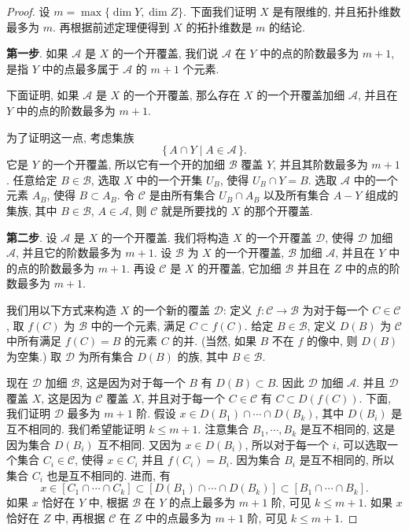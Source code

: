\begin{proof}
设 $m=\max\{\dim Y,\dim Z\}$. 下面我们证明 $X$ 是有限维的, 并且拓扑维数最多为 $m$. 再根据前述定理便得到 $X$ 的拓扑维数是 $m$ 的结论.

\textbf{第一步}. 如果 $\mathcal{A}$ 是 $X$ 的一个开覆盖, 我们说 $\mathcal{A}$ 在 $Y$ 中的点的阶数最多为 $m+1$, 是指 $Y$ 中的点最多属于 $\mathcal{A}$ 的 $m+1$ 个元素.

下面证明, 如果 $\mathcal{A}$ 是 $X$ 的一个开覆盖, 那么存在 $X$ 的一个开覆盖加细 $\mathcal{A}$, 并且在 $Y$ 中的点的阶数最多为 $m+1$.

为了证明这一点, 考虑集族
\[
\{\,A\cap Y\mid A\in\mathcal{A}\,\}.
\]
它是 $Y$ 的一个开覆盖, 所以它有一个开的加细 $\mathcal{B}$ 覆盖 $Y$, 并且其阶数最多为 $m+1$. 任意给定 $B\in\mathcal{B}$, 选取 $X$ 中的一个开集 $U_B$, 使得 $U_B\cap Y=B$. 选取 $\mathcal{A}$ 中的一个元素 $A_B$, 使得 $B\subset A_B$. 令 $\mathcal{C}$ 是由所有集合 $U_B\cap A_B$ 以及所有集合 $A-Y$ 组成的集族, 其中 $B\in\mathcal{B}$, $A\in\mathcal{A}$, 则 $\mathcal{C}$ 就是所要找的 $X$ 的那个开覆盖.

\textbf{第二步}. 设 $\mathcal{A}$ 是 $X$ 的一个开覆盖. 我们将构造 $X$ 的一个开覆盖 $\mathcal{D}$, 使得 $\mathcal{D}$ 加细 $\mathcal{A}$, 并且它的阶数最多为 $m+1$. 设 $\mathcal{B}$ 为 $X$ 的一个开覆盖, $\mathcal{B}$ 加细 $\mathcal{A}$, 并且在 $Y$ 中的点的阶数最多为 $m+1$. 再设 $\mathcal{C}$ 是 $X$ 的开覆盖, 它加细 $\mathcal{B}$ 并且在 $Z$ 中的点的阶数最多为 $m+1$.

我们用以下方式来构造 $X$ 的一个新的覆盖 $\mathcal{D}$: 定义 $f\colon\mathcal{C}\to\mathcal{B}$ 为对于每一个 $C\in\mathcal{C}$, 取 $f(C)$ 为 $\mathcal{B}$ 中的一个元素, 满足 $C\subset f(C)$. 给定 $B\in\mathcal{B}$, 定义 $D(B)$ 为 $\mathcal{C}$ 中所有满足 $f(C)=B$ 的元素 $C$ 的并. (当然, 如果 $B$ 不在 $f$ 的像中, 则 $D(B)$ 为空集.) 取 $\mathcal{D}$ 为所有集合 $D(B)$ 的族, 其中 $B\in\mathcal{B}$.

现在 $\mathcal{D}$ 加细 $\mathcal{B}$, 这是因为对于每一个 $B$ 有 $D(B)\subset B$. 因此 $\mathcal{D}$ 加细 $\mathcal{A}$. 并且 $\mathcal{D}$ 覆盖 $X$, 这是因为 $\mathcal{C}$ 覆盖 $X$, 并且对于每一个 $C\in\mathcal{C}$ 有 $C\subset D(f(C))$. 下面, 我们证明 $\mathcal{D}$ 最多为 $m+1$ 阶. 假设 $x\in D(B_1)\cap\cdots\cap D(B_k)$, 其中 $D(B_i)$ 是互不相同的. 我们希望能证明 $k\leqslant m+1$. 注意集合 $B_1,\cdots,B_k$ 是互不相同的, 这是因为集合 $D(B_i)$ 互不相同. 又因为 $x\in D(B_i)$, 所以对于每一个 $i$, 可以选取一个集合 $C_i\in\mathcal{C}$, 使得 $x\in C_i$ 并且 $f(C_i)=B_i$. 因为集合 $B_i$ 是互不相同的, 所以集合 $C_i$ 也是互不相同的. 进而, 有
\[
x\in[C_{1}\cap\cdots\cap C_{k}]\subset[D(B_{1})\cap\cdots\cap D(B_{k})]\subset[B_{1}\cap\cdots\cap B_{k}].
\]
如果 $x$ 恰好在 $Y$ 中, 根据 $\mathcal{B}$ 在 $Y$ 的点上最多为 $m+1$ 阶, 可见 $k\leqslant m+1$. 如果 $x$ 恰好在 $Z$ 中, 再根据 $\mathcal{C}$ 在 $Z$ 中的点最多为 $m+1$ 阶, 可见 $k\leqslant m+1$.
\end{proof}

